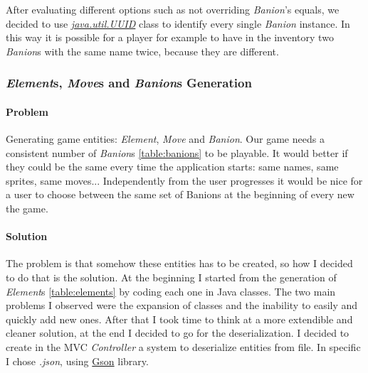 \documentclass[12pt, a4paper]{report}
\theoremstyle{definition}
\begin{document}
            After evaluating different options such as not overriding \emph{Banion}'s equals, we decided to use
            \href{https://docs.oracle.com/en/java/javase/17/docs/api/java.base/java/util/UUID.html}{\textit{java.util.UUID}} class to identify every single \emph{Banion} instance.
            In this way it is possible for a player for example to have in the inventory two \emph{Banion}s with the same name twice, because they are different.

        \subsubsection{\emph{Element}s, \emph{Move}s and \emph{Banion}s Generation}

            \paragraph{Problem}
            
            Generating game entities: \emph{Element}, \emph{Move} and \emph{Banion}. Our game needs a consistent number of \emph{Banion}s \ref{table:banions} to be playable.
            It would better if they could be the same every time the application starts: same names, same sprites, same moves...
            Independently from the user progresses it would be nice for a user to choose between the same set of Banions at the beginning of every new the game.

            \paragraph{Solution}

            The problem is that somehow these entities has to be created, so how I decided to do that is the solution.
            At the beginning I started from the generation of \emph{Element}s \ref{table:elements} by coding each one in Java classes.
            The two main problems I observed were the expansion of classes and the inability to easily and quickly add new ones.
            After that I took time to think at a more extendible and cleaner solution, at the end I decided to go for the deserialization.
            I decided to create in the MVC \emph{Controller} a system to deserialize entities from file.
            In specific I chose \textit{.json}, using \href{https://github.com/google/gson}{Gson} library.
            
\end{document}
